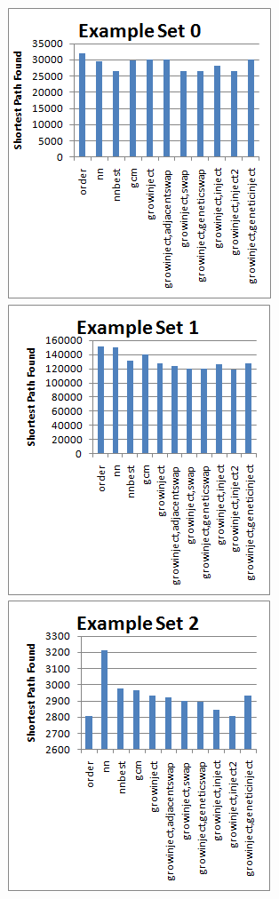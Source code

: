\documentclass{article}
\begin{document}
\includegraphics[totalheight=0.27\textheight]{set0.png}\includegraphics[totalheight=0.27\textheight]{set1.png}\includegraphics[totalheight=0.27\textheight]{set2.png}
\end{document}
